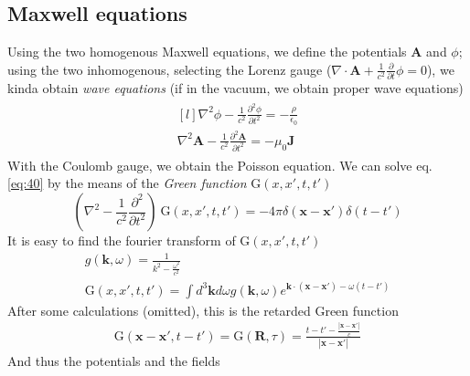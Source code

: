\documentclass[a4paper, twocolumn]{article}
\begin{document}
\subsection{Maxwell equations}
\label{sec:maxwell-equations}
Using the two homogenous Maxwell equations, we define the potentials $\mathbf{A}$ and $\phi$; using the two inhomogenous, selecting the Lorenz gauge ($\nabla\cdot\mathbf{A}+\frac{1}{c^2}\frac{\partial}{\partial t}\phi=0$), we kinda obtain \emph{wave equations} (if in the vacuum, we obtain proper wave equations)
\begin{gather}
  \begin{aligned}[l]
      \label{eq:40}
      \nabla^2\phi -\frac{1}{c^2}\frac{\partial^2\phi}{\partial t^2}=-\frac{\rho}{\epsilon_0} \\
      \nabla^2\mathbf{A}-\frac{1}{c^2}\frac{\partial^2\mathbf{A}}{\partial t^2}= -\mu_0 \mathbf{J} 
  \end{aligned}
\end{gather}
With the Coulomb gauge, we obtain the Poisson equation.
We can solve eq. \ref{eq:40} by the means of the \emph{Green function} $\mathrm{G}(x,x',t,t')$
\begin{equation}
  \label{eq:34}
  (\nabla^2-\frac{1}{c^2}\frac{\partial^2}{\partial t^2})~\mathrm{G}(x,x',t,t')=-4\pi\delta(\mathbf{x}-\mathbf{x'})\delta(t-t')
\end{equation}
It is easy to find the fourier transform of $\mathrm{G}(x,x',t,t')$
\begin{gather}
  \label{eq:41}
  g(\mathbf{k},\omega)=\frac{1}{k^2-\frac{\omega^2}{c^2}} \\
  \mathrm{G}(x,x',t,t')=\int d^3\mathbf{k}d\omega g(\mathbf{k},\omega)e^{\mathbf{k}\cdot(\mathbf{x}-\mathbf{x'}) - \omega (t-t')}
\end{gather}
After some calculations (omitted), this is the retarded Green function
\begin{align}
  \label{eq:42}
  \mathrm{G}(\mathbf{x}-\mathbf{x'},t-t')=\mathrm{G}(\mathbf{R},\tau)=\frac{t-t'-\frac{\left|\mathbf{x}-\mathbf{x'} \right|}{c}}{\left|\mathbf{x}-\mathbf{x'} \right|}
\end{align}
And thus the potentials and the fields
\end{document}
